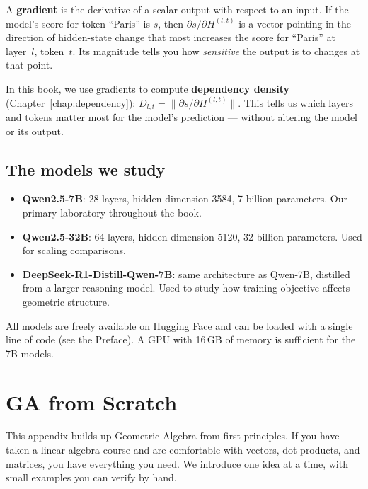 \documentclass[11pt, twoside, openright]{memoir}
\numberwithin{equation}{chapter}
\begin{document}
A \textbf{gradient} is the derivative of a scalar output with respect
to an input.  If the model's score for token ``Paris'' is
$s$, then $\partial s / \partial H^{(l,t)}$ is a vector pointing in
the direction of hidden-state change that most increases the score for
``Paris'' at layer~$l$, token~$t$.  Its magnitude tells you how
\emph{sensitive} the output is to changes at that point.

In this book, we use gradients to compute \textbf{dependency density}
(Chapter~\ref{chap:dependency}): $D_{l,t} = \|\partial s / \partial
H^{(l,t)}\|$.  This tells us which layers and tokens matter most for
the model's prediction --- without altering the model or its output.

\section{The models we study}

\begin{itemize}[nosep]
\item \textbf{Qwen2.5-7B}: 28 layers, hidden dimension 3584, 7 billion
  parameters.  Our primary laboratory throughout the book.
\item \textbf{Qwen2.5-32B}: 64 layers, hidden dimension 5120, 32
  billion parameters.  Used for scaling comparisons.
\item \textbf{DeepSeek-R1-Distill-Qwen-7B}: same architecture as
  Qwen-7B, distilled from a larger reasoning model.  Used to study
  how training objective affects geometric structure.
\end{itemize}

All models are freely available on Hugging Face and can be loaded with
a single line of code (see the Preface).  A GPU with 16\,GB of memory
is sufficient for the 7B models.


\chapter{GA from Scratch}
\label{app:ga-formal}

This appendix builds up Geometric Algebra from first principles.
If you have taken a linear algebra course and are comfortable with
vectors, dot products, and matrices, you have everything you need.
We introduce one idea at a time, with small examples you can verify
by hand.
\end{document}
